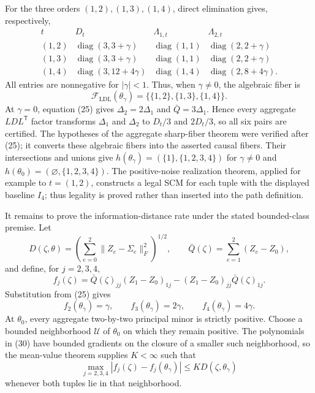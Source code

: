 For the three orders \((1,2),(1,3),(1,4)\), direct elimination gives, respectively,
\[
 \begin{array}{c|c|c|c}
 t&D_t&\Lambda_{1,t}&\Lambda_{2,t}\\ \hline
 (1,2)&\operatorname{diag}(3,3+\gamma)&\operatorname{diag}(1,1)&\operatorname{diag}(2,2+\gamma)\\
 (1,3)&\operatorname{diag}(3,3+\gamma)&\operatorname{diag}(1,1)&\operatorname{diag}(2,2+\gamma)\\
 (1,4)&\operatorname{diag}(3,12+4\gamma)&\operatorname{diag}(1,4)&\operatorname{diag}(2,8+4\gamma).
 \end{array} \tag{27}
\]
All entries are nonnegative for \(|\gamma|<1\).  Thus, when \(\gamma\ne0\), the algebraic fiber is
\[
 \mathcal F_{\mathrm{LDL}}(\theta_\gamma)
 =\{\{1,2\},\{1,3\},\{1,4\}\}. \tag{28}
\]
At \(\gamma=0\), equation (25) gives \(\Delta_2=2\Delta_1\) and \(\bar Q=3\Delta_1\).  Hence every aggregate \(LDL^{\mathsf T}\) factor transforms \(\Delta_1\) and \(\Delta_2\) to \(D_t/3\) and \(2D_t/3\), so all six pairs are certified.  The hypotheses of the aggregate sharp-fiber theorem were verified after (25); it converts these algebraic fibers into the asserted causal fibers.  Their intersections and unions give
\(h(\theta_\gamma)=(\{1\},\{1,2,3,4\})\) for \(\gamma\ne0\) and
\(h(\theta_0)=(\varnothing,\{1,2,3,4\})\).  The positive-noise realization theorem, applied for example to \(t=(1,2)\), constructs a legal SCM for each tuple with the displayed baseline \(I_4\); thus legality is proved rather than inserted into the path definition.

It remains to prove the information-distance rate under the stated bounded-class premise.  Let
\[
 D(\zeta,\theta)=\left(\sum_{e=0}^2\lVert Z_e-\Sigma_e\rVert_F^2\right)^{1/2},
 \qquad
 \bar Q(\zeta)=\sum_{e=1}^2(Z_e-Z_0), \tag{29}
\]
and define, for \(j=2,3,4\),
\[
 f_j(\zeta)=\bar Q(\zeta)_{jj}(Z_1-Z_0)_{1j}
 -(Z_1-Z_0)_{jj}\bar Q(\zeta)_{1j}. \tag{30}
\]
Substitution from (25) gives
\[
 f_2(\theta_\gamma)=\gamma,\qquad
 f_3(\theta_\gamma)=2\gamma,\qquad
 f_4(\theta_\gamma)=4\gamma. \tag{31}
\]
At \(\theta_0\), every aggregate two-by-two principal minor is strictly positive.  Choose a bounded neighborhood \(\mathcal U\) of \(\theta_0\) on which they remain positive.  The polynomials in (30) have bounded gradients on the closure of a smaller such neighborhood, so the mean-value theorem supplies \(K<\infty\) such that
\[
 \max_{j=2,3,4}|f_j(\zeta)-f_j(\theta_\gamma)|
 \le K D(\zeta,\theta_\gamma) \tag{32}
\]
whenever both tuples lie in that neighborhood.


